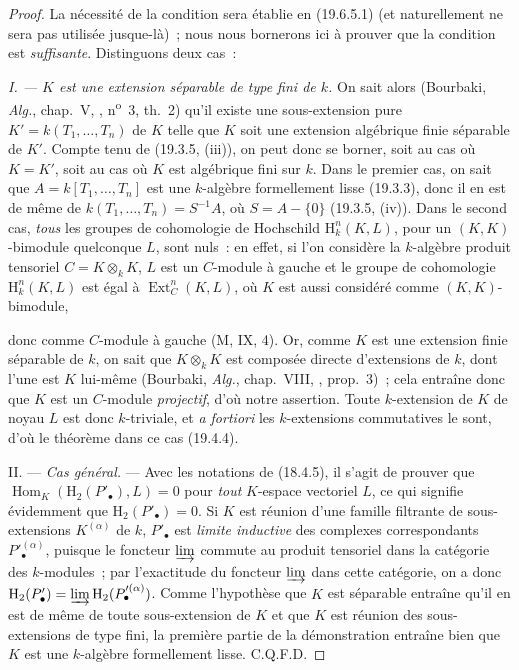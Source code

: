 \begin{proof}
La nécessité de la condition sera établie en (19.6.5.1) (et naturellement ne
sera pas utilisée jusque-là)~; nous nous bornerons ici à prouver que la
condition est \emph{suffisante}. Distinguons deux cas~:

\emph{I. --- $K$ est une extension séparable de type fini de $k$.} On sait
alors (Bourbaki, \emph{Alg.}, chap.~V, ,
n\textsuperscript{o}~3, th.~2) qu'il existe une sous-extension pure
$K'=k(T_1,\ldots,T_n)$ de $K$ telle que $K$ soit une extension algébrique
finie séparable de $K'$. Compte tenu de (19.3.5, (iii)), on peut donc se
borner, soit au cas où $K=K'$, soit au cas où $K$ est algébrique fini sur $k$.
Dans le premier cas, on sait que $A=k[T_1,\ldots,T_n]$ est une $k$-algèbre
formellement lisse (19.3.3), donc il en est de même de
$k(T_1,\ldots,T_n)=S^{-1}A$, où $S=A-\{0\}$ (19.3.5, (iv)). Dans le second
cas, \emph{tous} les groupes de cohomologie de Hochschild
$\mathrm H_k^n(K,L)$, pour un $(K,K)$-bimodule quelconque $L$, sont nuls~: en
effet, si l'on considère la $k$-algèbre produit tensoriel $C=K\otimes_k K$,
$L$ est un $C$-module à gauche et le groupe de cohomologie
$\mathrm H_k^n(K,L)$ est égal à $\operatorname{Ext}_C^n(K,L)$, où $K$ est
aussi considéré comme $(K,K)$-bimodule,


donc comme $C$-module à gauche (M, IX, 4). Or, comme $K$ est une extension
finie séparable de $k$, on sait que $K\otimes_k K$ est composée directe
d'extensions de $k$, dont l'une est $K$ lui-même (Bourbaki, \emph{Alg.},
chap.~VIII, , prop.~3)~; cela entraîne donc que $K$ est un
$C$-module \emph{projectif}, d'où notre assertion. Toute $k$-extension de $K$
de noyau $L$ est donc $k$-triviale, et \emph{a fortiori} les $k$-extensions
commutatives le sont, d'où le théorème dans ce cas (19.4.4).

II. --- \emph{Cas général.} --- Avec les notations de (18.4.5), il s'agit de
prouver que $\operatorname{Hom}_K(\mathrm H_2(P'_\bullet),L)=0$ pour
\emph{tout} $K$-espace vectoriel $L$, ce qui signifie évidemment que
$\mathrm H_2(P'_\bullet)=0$. Si $K$ est réunion d'une famille filtrante de
sous-extensions $K^{(\alpha)}$ de $k$, $P'_\bullet$ est \emph{limite
inductive} des complexes correspondants $P'^{(\alpha)}_\bullet$, puisque le
foncteur $\varinjlim$ commute au produit tensoriel dans la catégorie des
$k$-modules~; par l'exactitude du foncteur $\varinjlim$ dans cette catégorie,
on a donc
$\mathrm H_2(P'_\bullet)=\varinjlim\mathrm H_2(P'^{(\alpha)}_\bullet)$.
Comme l'hypothèse que $K$ est séparable entraîne qu'il en est de même de toute
sous-extension de $K$ et que $K$ est réunion des sous-extensions de type fini,
la première partie de la démonstration entraîne bien que $K$ est une
$k$-algèbre formellement lisse. C.Q.F.D.
\end{proof}

